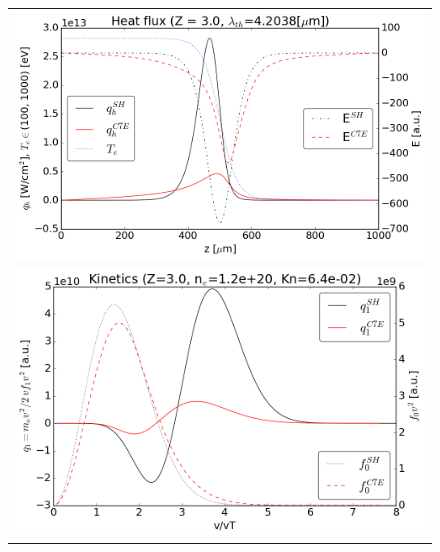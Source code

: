\documentclass[preprint,12pt]{elsarticle}
\begin{document}
\begin{figure}[tbh]
  \begin{center}
    \begin{tabular}{c}
      \includegraphics[width=1.0\textwidth]{../results/fe_analysis/C7E/P5_heatflux_Z3_Kn46e-3.png} \\ 
      \includegraphics[width=1.0\textwidth]{../results/fe_analysis/C7E/P5_kinetics_Z3_Kn46e-3.png}
    \end{tabular}
  \caption{
  }
  \end{center}
  \label{fig:AWBScorrection_f1}
\end{figure}
\end{document}
